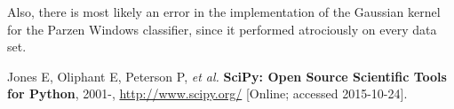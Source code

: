 \documentclass{article}
\numberwithin{figure}{section}
\begin{document}
Also, there is most likely an error in the implementation of the Gaussian kernel for the Parzen Windows classifier, since it performed atrociously on every data set.






\begin{thebibliography}{9}

    Jones E, Oliphant E, Peterson P, \emph{et al.}
    {\bf SciPy: Open Source Scientific Tools for Python}, 2001-,
    \url{http://www.scipy.org/} [Online; accessed 2015-10-24].

\end{thebibliography}

\end{document}
